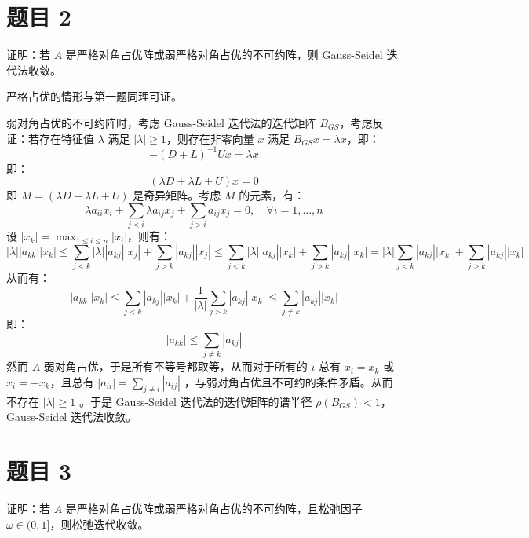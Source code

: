 \documentclass{article}
\begin{document}
\section{题目 2}

证明：若 $A$ 是严格对角占优阵或弱严格对角占优的不可约阵，则 Gauss-Seidel 迭代法收敛。

\begin{solution}
  严格占优的情形与第一题同理可证。

  弱对角占优的不可约阵时，考虑 Gauss-Seidel 迭代法的迭代矩阵 $B_{GS}$，考虑反证：若存在特征值 $\lambda$ 满足
  $|\lambda| \geq 1$，则存在非零向量 $x$ 满足 $B_{GS} x = \lambda x$，即：
  \[
    -(D+L)^{-1} Ux = \lambda x
  \]
  即：
  \[
    (\lambda D + \lambda L + U) x = 0
  \]
  即 $M = (\lambda D + \lambda L + U)$ 是奇异矩阵。考虑 $M$ 的元素，有：
  \[
    \lambda a_{ii} x_i + \sum_{j < i} \lambda a_{ij} x_j + \sum_{j >
    i} a_{ij} x_j = 0, \quad \forall i = 1, \dots, n
  \]
  设 $|x_k| = \max_{1 \leq i \leq n} |x_i|$，则有：
  \[
    |\lambda| |a_{kk}| |x_k| \leq \sum_{j < k} |\lambda| |a_{kj}| |x_j| +
    \sum_{j > k} |a_{kj}| |x_j| \leq \sum_{j < k} |\lambda| |a_{kj}| |x_k| +
    \sum_{j > k} |a_{kj}| |x_k| = |\lambda| \sum_{j < k} |a_{kj}| |x_k| +
    \sum_{j > k} |a_{kj}| |x_k|
  \]
  从而有：
  \[
    |a_{kk}| |x_k| \leq \sum_{j<k} |a_{kj}| |x_k| + \frac{1}{|\lambda|}
    \sum_{j>k} |a_{kj}| |x_k| \leq \sum_{j \neq k} |a_{kj}| |x_k|
  \]
  即：
  \[
    |a_{kk}| \leq \sum_{j \neq k} |a_{kj}|
  \]
  然而 $A$ 弱对角占优，于是所有不等号都取等，从而对于所有的 $i$ 总有 $x_i = x_k$ 或 $x_i =
  -x_k$，且总有 $|a_{ii}| = \sum_{j \neq i} |a_{ij}|$
  ，与弱对角占优且不可约的条件矛盾。从而不存在 $|\lambda| \geq 1$ 。于是 Gauss-Seidel
  迭代法的迭代矩阵的谱半径 $\rho(B_{GS}) < 1$，Gauss-Seidel 迭代法收敛。
\end{solution}

\section{题目 3}

证明：若 $A$ 是严格对角占优阵或弱严格对角占优的不可约阵，且松弛因子 $\omega \in (0,1]$，则松弛迭代收敛。
\end{document}
